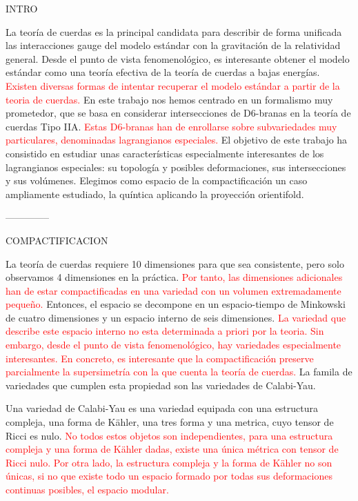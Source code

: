 \documentclass[oneside,secnumarabic,10pt,nobalancelastpage,nofootinbib,a4paper]{article}
\begin{document}
INTRO

La teoría de cuerdas es la principal candidata para describir de forma unificada las interacciones gauge
del modelo estándar con la gravitación de la relatividad general.
Desde el punto de vista fenomenológico, es interesante obtener el modelo estándar como una teoría
efectiva de la teoría de cuerdas a bajas energías.
\textcolor{red}{Existen diversas formas de intentar recuperar el modelo estándar a partir de la teoria de cuerdas.}
En este trabajo nos hemos centrado en un formalismo muy prometedor, que se basa en considerar intersecciones
de D6-branas en la teoría de cuerdas Tipo IIA.
\textcolor{red}{Estas D6-branas han de enrollarse sobre subvariedades muy particulares, denominadas lagrangianos especiales.}
El objetivo de este trabajo ha consistido en estudiar unas características especialmente interesantes de los lagrangianos especiales:
su topología y posibles deformaciones, sus intersecciones y sus volúmenes.
Elegimos como espacio de la compactificación un caso ampliamente estudiado, la quíntica aplicando la proyección orientifold.

--------------

COMPACTIFICACION

La teoría de cuerdas requiere 10 dimensiones para que sea consistente, pero solo observamos 4 dimensiones en la práctica.
\textcolor{red}{Por tanto, las dimensiones adicionales han de estar compactificadas en una variedad con un volumen extremadamente pequeño.}
Entonces, el espacio se decompone en un espacio-tiempo de Minkowski de cuatro dimensiones y un espacio interno de seis dimensiones.
\textcolor{red}{La variedad que describe este espacio interno no esta determinada a priori por la teoria.
Sin embargo, desde el punto de vista fenomenológico, hay variedades especialmente interesantes.
En concreto, es interesante que la compactificación preserve parcialmente la supersimetría con la que cuenta
la teoría de cuerdas.}
La famila de variedades que cumplen esta propiedad son las variedades de Calabi-Yau.

Una variedad de Calabi-Yau es una variedad equipada con una estructura compleja, una forma de Kähler, una 
tres forma y una metrica, cuyo tensor de Ricci es nulo. 
\textcolor{red}{No todos estos objetos son independientes, para una estructura compleja y una forma de Kähler dadas, existe 
una única métrica con tensor de Ricci nulo.
Por otra lado, la estructura compleja y la forma de Kähler no son únicas, si no que existe todo un espacio 
formado por todas sus deformaciones continuas posibles, el espacio modular.}
\end{document}
